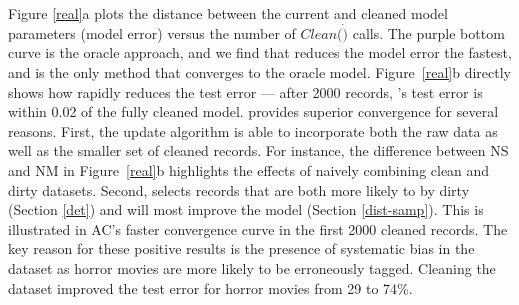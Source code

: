 Figure \ref{real}a plots the distance between the current and cleaned model parameters (model error) versus the number of $Clean(\dot)$ calls.  
The purple bottom curve is the oracle approach, and we find that \sys reduces the model error the fastest, and is the only method that converges to the oracle model.
Figure~\ref{real}b directly shows how \sys rapidly reduces the test error --- after 2000 records, \sys's test error is within 0.02 of the fully cleaned model.
\sys provides superior convergence for several reasons.
First, the update algorithm is able to incorporate both the raw data as well as the smaller set of cleaned records.
For instance, the difference between NS and NM in Figure~\ref{real}b highlights the effects of naively combining clean and dirty datasets.
Second, \sys selects records that are both more likely to by dirty (Section \ref{det}) and will most improve the model (Section \ref{dist-samp}).
This is illustrated in AC's faster convergence curve in the first 2000 cleaned records.
The key reason for these positive results is the presence of systematic bias in the dataset as horror movies are more likely to be erroneously tagged.
Cleaning the dataset improved the test error for horror movies from 29 to 74\%.



